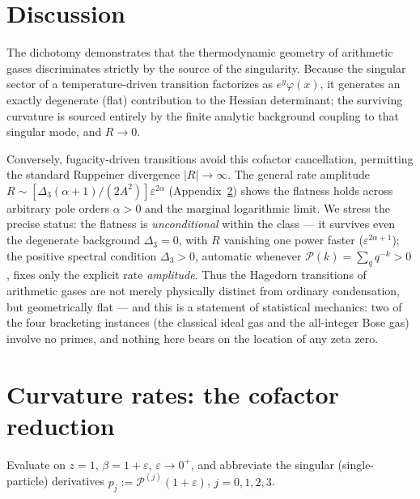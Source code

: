 \documentclass[a4paper,11pt]{article}
\theoremstyle{plain}
\theoremstyle{definition}
\theoremstyle{remark}
\newcommand{\Ric}{R}
\newcommand{\eps}{\varepsilon}
\begin{document}
\section{Discussion}\label{sec:disc}
The dichotomy demonstrates that the thermodynamic geometry of arithmetic gases discriminates strictly
by the source of the singularity. Because the singular sector of a temperature-driven transition
factorizes as $e^{y}\varphi(x)$, it generates an exactly degenerate (flat) contribution to the
Hessian determinant; the surviving curvature is sourced entirely by the finite analytic background
coupling to that singular mode, and $\Ric\to0$.

Conversely, fugacity-driven transitions avoid this cofactor cancellation, permitting the standard
Ruppeiner divergence $|\Ric|\to\infty$. The general rate amplitude
$\Ric\sim[\Delta_3(\alpha+1)/(2A^2)]\eps^{2\alpha}$ (Appendix~\ref{app:rates}) shows the flatness
holds across arbitrary pole orders $\alpha>0$ and the marginal logarithmic limit. We stress the
precise status: the flatness is \emph{unconditional} within the class --- it survives even the
degenerate background $\Delta_3=0$, with $\Ric$ vanishing one power faster ($\eps^{2\alpha+1}$); the
positive spectral condition $\Delta_3>0$, automatic whenever $\mathcal P(k)=\sum_q q^{-k}>0$, fixes
only the explicit rate \emph{amplitude}. Thus the Hagedorn transitions of arithmetic gases are not
merely physically distinct from ordinary condensation, but geometrically flat --- and this is a
statement of statistical mechanics: two of the four bracketing instances (the classical ideal gas and
the all-integer Bose gas) involve no primes, and nothing here bears on the location of any zeta zero.

\appendix
\section{Curvature rates: the cofactor reduction}\label{app:rates}

Evaluate on $z=1$, $\beta=1+\eps$, $\eps\to0^{+}$, and abbreviate the singular (single-particle)
derivatives $p_j:=\mathcal P^{(j)}(1+\eps)$, $j=0,1,2,3$.
\end{document}

